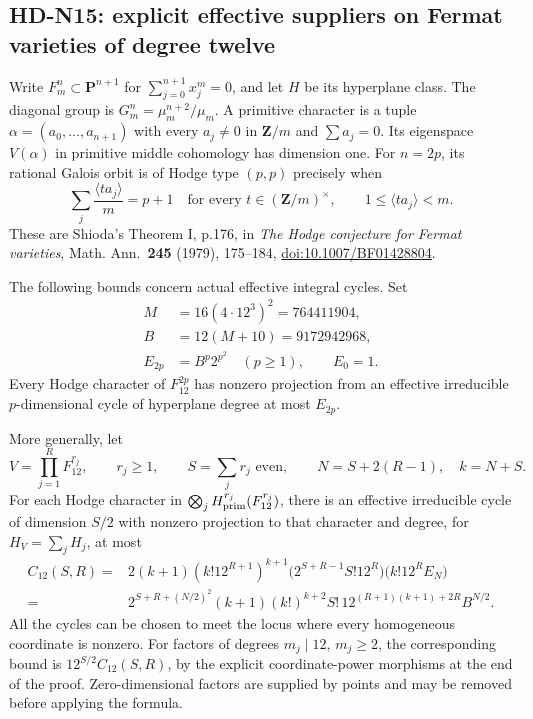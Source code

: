 \subsection{HD-N15: explicit effective suppliers on Fermat varieties of degree twelve}
\label{sec:HD-N15}

Write $F_m^n\subset\mathbf P^{n+1}$ for
$\sum_{j=0}^{n+1}x_j^m=0$, and let $H$ be its hyperplane class.
The diagonal group is $G_m^n=\mu_m^{n+2}/\mu_m$.
A primitive character is a tuple
$\alpha=(a_0,\ldots,a_{n+1})$ with every $a_j\ne0$ in
$\mathbf Z/m$ and $\sum a_j=0$.
Its eigenspace $V(\alpha)$ in primitive middle cohomology has
dimension one.  For $n=2p$, its rational Galois orbit is of
Hodge type $(p,p)$ precisely when
\[
 \sum_j\frac{\langle ta_j\rangle}{m}=p+1
 \quad\text{for every }t\in(\mathbf Z/m)^\times,
 \qquad 1\leq\langle ta_j\rangle<m.
                                                        \tag{N15.1}
\]
These are Shioda's Theorem I, p.176, in
\emph{The Hodge conjecture for Fermat varieties},
Math. Ann.\ \textbf{245} (1979), 175--184,
\href{https://doi.org/10.1007/BF01428804}{doi:10.1007/BF01428804}.

The following bounds concern actual effective integral cycles.
Set
\begin{equation}
 \begin{split}
 M&=16(4\cdot12^3)^2=764411904,\\
 B&=12(M+10)=9172942968,\\
 E_{2p}&=B^p2^{p^2}\quad(p\geq1),\qquad E_0=1.
 \end{split}                                           \tag{N15.2}
\end{equation}
Every Hodge character of $F_{12}^{2p}$ has nonzero projection
from an effective irreducible $p$-dimensional cycle of
hyperplane degree at most $E_{2p}$.

More generally, let
\[
 V=\prod_{j=1}^R F_{12}^{r_j},\qquad r_j\geq1,
 \qquad S=\sum_jr_j\text{ even},\qquad
 N=S+2(R-1),\quad k=N+S.
\]
For each Hodge character in
$\bigotimes_jH^{r_j}_{\rm prim}(F_{12}^{r_j})$,
there is an effective irreducible cycle of dimension $S/2$
with nonzero projection to that character and degree, for
$H_V=\sum_jH_j$, at most
\begin{equation}
 \begin{split}
 C_{12}(S,R)={}&2(k+1)(k!12^{R+1})^{k+1}
       \bigl(2^{S+R-1}S!12^R\bigr)
       \bigl(k!12^R E_N\bigr)\\
 ={}&2^{S+R+(N/2)^2}(k+1)(k!)^{k+2}S!\,
       12^{(R+1)(k+1)+2R}B^{N/2}.
 \end{split}                                           \tag{N15.3}
\end{equation}
All the cycles can be chosen to meet the locus where every
homogeneous coordinate is nonzero.  For factors of degrees
$m_j\mid12$, $m_j\geq2$, the corresponding bound is
$12^{S/2}C_{12}(S,R)$, by the explicit coordinate-power morphisms
at the end of the proof.  Zero-dimensional factors are supplied
by points and may be removed before applying the formula.

